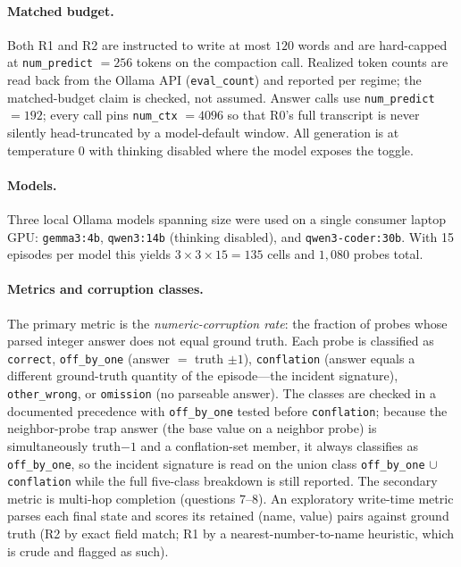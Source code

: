 \documentclass[11pt]{article}
\begin{document}
\paragraph{Matched budget.}
Both R1 and R2 are instructed to write at most $120$ words and are hard-capped
at \texttt{num\_predict} $=256$ tokens on the compaction call. Realized token
counts are read back from the Ollama API (\texttt{eval\_count}) and reported
per regime; the matched-budget claim is checked, not assumed. Answer calls use
\texttt{num\_predict} $=192$; every call pins \texttt{num\_ctx} $=4096$ so
that R0's full transcript is never silently head-truncated by a model-default
window. All generation is at temperature $0$ with thinking disabled where the
model exposes the toggle.

\paragraph{Models.}
Three local Ollama models spanning size were used on a single consumer laptop
GPU: \texttt{gemma3:4b}, \texttt{qwen3:14b} (thinking disabled), and
\texttt{qwen3-coder:30b}. With 15 episodes per model this yields
$3\times3\times15=135$ cells and $1{,}080$ probes total.

\paragraph{Metrics and corruption classes.}
The primary metric is the \emph{numeric-corruption rate}: the fraction of
probes whose parsed integer answer does not equal ground truth. Each probe is
classified as \texttt{correct}, \texttt{off\_by\_one} (answer $=$ truth
$\pm1$), \texttt{conflation} (answer equals a different ground-truth quantity
of the episode---the incident signature), \texttt{other\_wrong}, or
\texttt{omission} (no parseable answer). The classes are checked in a
documented precedence with \texttt{off\_by\_one} tested before
\texttt{conflation}; because the neighbor-probe trap answer (the base value on
a neighbor probe) is simultaneously truth$-1$ and a conflation-set member, it
always classifies as \texttt{off\_by\_one}, so the incident signature is read
on the union class \texttt{off\_by\_one} $\cup$ \texttt{conflation} while the
full five-class breakdown is still reported. The secondary metric is multi-hop
completion (questions 7--8). An exploratory write-time metric parses each
final state and scores its retained (name, value) pairs against ground truth
(R2 by exact field match; R1 by a nearest-number-to-name heuristic, which is
crude and flagged as such).
\end{document}
